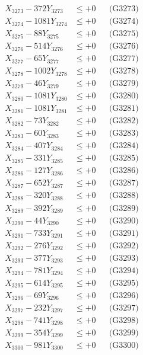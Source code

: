 \documentclass[a4paper,10pt]{article}
\begin{document}
{\begin{align}
X_{3273} - 372Y_{3273} &\leq +0 && \text{(G3273)} \\
X_{3274} - 1081Y_{3274} &\leq +0 && \text{(G3274)} \\
X_{3275} - 88Y_{3275} &\leq +0 && \text{(G3275)} \\
X_{3276} - 514Y_{3276} &\leq +0 && \text{(G3276)} \\
X_{3277} - 65Y_{3277} &\leq +0 && \text{(G3277)} \\
X_{3278} - 1002Y_{3278} &\leq +0 && \text{(G3278)} \\
X_{3279} - 46Y_{3279} &\leq +0 && \text{(G3279)} \\
X_{3280} - 1081Y_{3280} &\leq +0 && \text{(G3280)} \\
\allowbreak
X_{3281} - 1081Y_{3281} &\leq +0 && \text{(G3281)} \\
X_{3282} - 73Y_{3282} &\leq +0 && \text{(G3282)} \\
X_{3283} - 60Y_{3283} &\leq +0 && \text{(G3283)} \\
X_{3284} - 407Y_{3284} &\leq +0 && \text{(G3284)} \\
X_{3285} - 331Y_{3285} &\leq +0 && \text{(G3285)} \\
X_{3286} - 127Y_{3286} &\leq +0 && \text{(G3286)} \\
X_{3287} - 652Y_{3287} &\leq +0 && \text{(G3287)} \\
X_{3288} - 320Y_{3288} &\leq +0 && \text{(G3288)} \\
X_{3289} - 392Y_{3289} &\leq +0 && \text{(G3289)} \\
X_{3290} - 44Y_{3290} &\leq +0 && \text{(G3290)} \\
\allowbreak
X_{3291} - 733Y_{3291} &\leq +0 && \text{(G3291)} \\
X_{3292} - 276Y_{3292} &\leq +0 && \text{(G3292)} \\
X_{3293} - 377Y_{3293} &\leq +0 && \text{(G3293)} \\
X_{3294} - 781Y_{3294} &\leq +0 && \text{(G3294)} \\
X_{3295} - 614Y_{3295} &\leq +0 && \text{(G3295)} \\
X_{3296} - 69Y_{3296} &\leq +0 && \text{(G3296)} \\
X_{3297} - 232Y_{3297} &\leq +0 && \text{(G3297)} \\
X_{3298} - 741Y_{3298} &\leq +0 && \text{(G3298)} \\
X_{3299} - 354Y_{3299} &\leq +0 && \text{(G3299)} \\
X_{3300} - 981Y_{3300} &\leq +0 && \text{(G3300)} \\

\end{align}}
\end{document}
